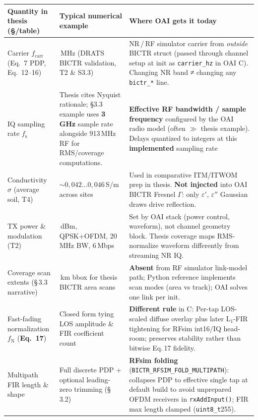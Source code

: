 \documentclass[11pt,a4paper]{article}
\begin{document}
\begingroup\setlength{\tabcolsep}{5pt}
\small
\begin{tabularx}{\textwidth}{@{}%
  >{\raggedright\arraybackslash}p{}
  >{\raggedright\arraybackslash}p{}
  X@{}} \toprule
\textbf{Quantity in thesis (\S/table)} &
\textbf{Typical numerical example} &
\textbf{Where OAI gets it today}\\
\midrule

Carrier $f_{\mathrm{carr}}$ (Eq.~7 PDP, Eq.~12--16) &
913\,MHz (DRATS BICTR validation, T2 \& S3.3)&
NR\,/\,RF simulator carrier from \emph{outside} BICTR struct (passed through channel setup at init as \texttt{carrier\_hz} in OAI C). Changing NR band ≠ changing any \texttt{bictr\_*} line.\\
\addlinespace

IQ sampling rate $f_{\mathrm{s}}$&
Thesis cites Nyquist rationale; §3.3 example uses \textbf{3\,GHz} sample rate alongside 913\,MHz RF for RMS/coverage computations.&
\textbf{Effective RF bandwidth / sample frequency} configured by the OAI radio model (often $\gg$ thesis example). Delays quantized to integers at this \textbf{implemented} sampling rate\\
\addlinespace

Conductivity $\sigma$ (average soil, T4) &
$\sim\! 0{,}042\ldots 0{,}046$\,S/m across sites&
Used in comparative ITM/ITWOM prep in thesis. \textbf{Not injected} into OAI BICTR Fresnel $\Gamma$: only $\varepsilon'$, $\varepsilon''$ Gaussian draws drive reflection.\\
\addlinespace

TX power \& modulation (T2)&
30\,dBm, QPSK+OFDM, 20\,MHz BW, 6\,Mbps&
Set by OAI stack (power control, waveform), not channel geometry block. Thesis coverage maps RMS-normalize waveform differently from streaming NR IQ.\\
\addlinespace

Coverage scan extents (\S\,3.3 narrative)&
5\,km bbox for thesis BICTR area scans&
\textbf{Absent} from RF simulator link-model path; Python reference implements scan modes (area vs track); OAI solves one link per init.\\
\addlinespace

Fast-fading normalization $f_{\text{N}}$ (\textbf{Eq.~17})&
Closed form tying LOS amplitude \& FIR coefficient count&
\textbf{Different rule} in C: Per-tap LOS-scaled diffuse overlay plus later L$_1$-FIR tightening for RFsim int16/IQ head-room; preserves stability rather than bitwise Eq.\,17 fidelity.\\
\addlinespace

Multipath FIR length \& shape&
Full discrete PDP + optional leading-zero trimming (\S\,3.2)&
\textbf{RFsim folding} (\texttt{BICTR\_RFSIM\_FOLD\_MULTIPATH}): collapses PDP to effective single tap at default build to avoid unprepared OFDM receivers in \texttt{rxAddInput()}; FIR max length clamped (\texttt{uint8\_t}255).\\
\bottomrule
\end{tabularx}
\endgroup
\end{document}

